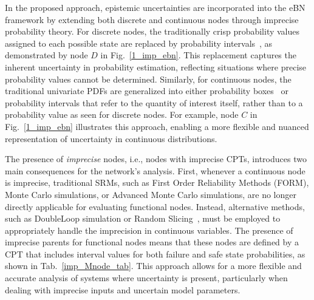 In the proposed approach, epistemic uncertainties are incorporated into the eBN framework by extending both discrete and continuous nodes through imprecise probability theory. For discrete nodes, the traditionally crisp probability values assigned to each possible state are replaced by probability intervals~\cite{weichselberger_theory_2000}, as demonstrated by node $D$ in Fig.~\ref{1_imp_ebn}. This replacement captures the inherent uncertainty in probability estimation, reflecting situations where precise probability values cannot be determined. Similarly, for continuous nodes, the traditional univariate PDFs are generalized into either probability boxes~\cite{ferson_2003} or probability intervals that refer to the quantity of interest itself, rather than to a probability value as seen for discrete nodes. For example, node $C$ in Fig.~\ref{1_imp_ebn} illustrates this approach, enabling a more flexible and nuanced representation of uncertainty in continuous distributions.

The presence of \textit{imprecise} nodes, i.e., nodes with imprecise CPTs, introduces two main consequences for the network's analysis. First, whenever a continuous node is imprecise, traditional SRMs, such as First Order Reliability Methods (FORM), Monte Carlo simulations, or Advanced Monte Carlo simulations, are no longer directly applicable for evaluating functional nodes. Instead, alternative methods, such as DoubleLoop simulation or Random Slicing~\cite{ALVAREZ_randomslicing}, must be employed to appropriately handle the imprecision in continuous variables. The presence of imprecise parents for functional nodes means that these nodes are defined by a CPT that includes interval values for both failure and safe state probabilities, as shown in Tab.~\ref{imp_Mnode_tab}. This approach allows for a more flexible and accurate analysis of systems where uncertainty is present, particularly when dealing with imprecise inputs and uncertain model parameters.

